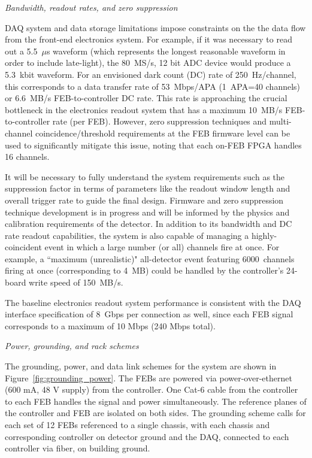 \textit{\it Bandwidth, readout rates, and zero suppression}

DAQ system and data storage limitations impose constraints on the the data flow from the front-end electronics system. 
For example, if it was necessary to read out a 5.5~$\mu$s waveform (which represents the longest reasonable waveform 
in order to include late-light), the 80~MS/s, 12 bit ADC device would produce a 5.3~kbit waveform. For an envisioned dark count (DC) rate of 250~Hz/channel, this corresponds to a data transfer rate of 53~Mbps/APA (1~APA=40 channels) or 6.6~MB/s FEB-to-controller DC rate. This rate is approaching the crucial bottleneck in the electronics readout system that has a maximum 10~MB/s FEB-to-controller rate (per FEB). However, zero suppression techniques and multi-channel coincidence/threshold requirements at the FEB firmware level can be used to significantly mitigate this issue, noting that each on-FEB FPGA handles 16 channels. 

It will be necessary to fully understand the system requirements such as the suppression factor in terms of parameters like the readout window length and overall trigger rate to guide the final design. 
Firmware and zero suppression technique development is in progress and will be informed by the physics and calibration requirements of the detector. 
In addition to its bandwidth and DC rate readout capabilities, the system is also capable of managing a highly-coincident event in which a large number (or all) channels fire at once. For example, a ``maximum (unrealistic)" all-detector event featuring 6000~channels firing at once (corresponding to 4~MB) could be handled by the controller's 24-board write speed of 150~MB/s. 

The baseline electronics readout system performance is consistent with the DAQ interface specification of 8~Gbps per connection as well, since each FEB signal corresponds to a maximum of 10 Mbps (240 Mbps total).  

\textit{\it Power, grounding, and rack schemes} 

The grounding, power, and data link schemes for the system are shown in Figure~\ref{fig:grounding_power}. The FEBs are powered via power-over-ethernet (600 mA, 48 V supply) from the controller. One Cat-6 cable from the controller to each FEB handles the signal and power simultaneously. The reference planes of the controller and FEB are isolated on both sides. The grounding scheme calls for each set of 12 FEBs referenced to a single chassis, with each chassis and corresponding controller on detector ground and the DAQ, connected to each controller via fiber, on building ground. 
 
